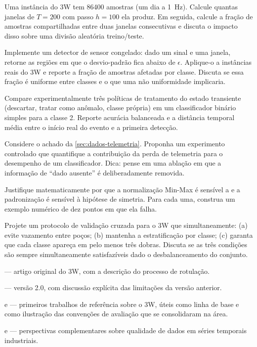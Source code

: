 \begin{exercicios}
\item Uma instância do 3W tem \num{86400} amostras (um dia a \SI{1}{\hertz}). Calcule
      quantas janelas de $T = 200$ com passo $h = 100$ ela produz. Em seguida, calcule a
      fração de amostras compartilhadas entre duas janelas consecutivas e discuta o
      impacto disso sobre uma divisão aleatória treino/teste.

\item Implemente um detector de sensor congelado: dado um sinal e uma janela, retorne
      as regiões em que o desvio-padrão fica abaixo de $\epsilon$. Aplique-o a
      instâncias reais do 3W e reporte a fração de amostras afetadas por classe.
      Discuta se essa fração é uniforme entre classes e o que uma não uniformidade
      implicaria.

\item Compare experimentalmente três políticas de tratamento do estado transiente
      (descartar, tratar como anômalo, classe própria) em um classificador binário
      simples para a classe 2. Reporte acurácia balanceada e a distância temporal média
      entre o início real do evento e a primeira detecção.

\item Considere o achado da \cref{sec:dados-telemetria}. Proponha um experimento
      controlado que quantifique a contribuição da perda de telemetria para o
      desempenho de um classificador. Dica: pense em uma ablação em que a informação de
      ``dado ausente'' é deliberadamente removida.

\item Justifique matematicamente por que a normalização Min-Max é sensível a
       e a padronização é sensível à hipótese de simetria. Para cada uma,
      construa um exemplo numérico de dez pontos em que ela falha.

\item Projete um protocolo de validação cruzada para o 3W que simultaneamente:
      (a) evite vazamento entre poços; (b) mantenha a estratificação por classe;
      (c) garanta que cada classe apareça em pelo menos três dobras. Discuta se as três
      condições são sempre simultaneamente satisfazíveis dado o desbalanceamento do
      conjunto.
\end{exercicios}

\begin{leituras}
\item \citet{VARGAS2019} --- artigo original do 3W, com a descrição do processo de
      rotulação.
\item \citet{VazVargas2026_3w2} --- versão 2.0, com discussão explícita das limitações da
      versão anterior.
\item \citet{marins2020fault} e \citet{Marins2021} --- primeiros trabalhos de referência
      sobre o 3W, úteis como linha de base e como ilustração das convenções de avaliação
      que se consolidaram na área.
\item \citet{carvalho2021flow} e \citet{bronstad2021data} --- perspectivas
      complementares sobre qualidade de dados em séries temporais industriais.
\end{leituras}
